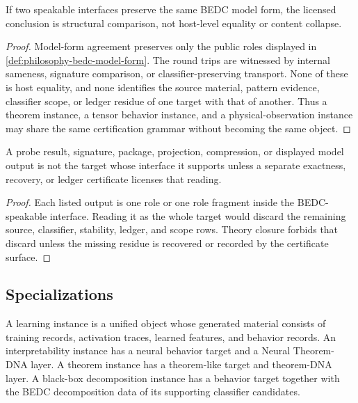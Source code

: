 \begin{theorem}
\label{thm:philosophy-model-form-agreement-not-object-identity}
If two speakable interfaces preserve the same BEDC model form, the
licensed conclusion is structural comparison, not host-level equality or
content collapse.
\end{theorem}
\begin{proof}
Model-form agreement preserves only the public roles displayed in
\autoref{def:philosophy-bedc-model-form}. The round trips are witnessed
by internal sameness, signature comparison, or classifier-preserving
transport. None of these is host equality, and none identifies the
source material, pattern evidence, classifier scope, or ledger residue of
one target with that of another. Thus a theorem instance, a tensor
behavior instance, and a physical-observation instance may share the
same certification grammar without becoming the same object.
\end{proof}

\begin{corollary}
\label{cor:philosophy-projection-not-ontology}
A probe result, signature, package, projection, compression, or displayed
model output is not the target whose interface it supports unless a
separate exactness, recovery, or ledger certificate licenses that
reading.
\end{corollary}
\begin{proof}
Each listed output is one role or one role fragment inside the
BEDC-speakable interface. Reading it as the whole target would discard
the remaining source, classifier, stability, ledger, and scope rows.
Theory closure forbids that discard unless the missing residue is
recovered or recorded by the certificate surface.
\end{proof}

\subsection{Specializations}
\label{subsec:philosophy-unified-specializations}

\begin{definition}
\label{def:philosophy-unified-specializations}
A learning instance is a unified object whose generated material consists
of training records, activation traces, learned features, and behavior
records. An interpretability instance has a neural behavior target and a
Neural Theorem-DNA layer. A theorem instance has a theorem-like target
and theorem-DNA layer. A black-box decomposition instance has a behavior
target together with the BEDC decomposition data of its supporting
classifier candidates.
\end{definition}

